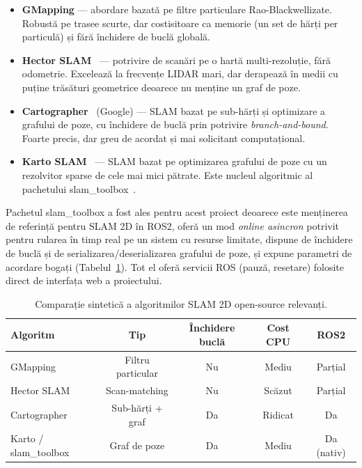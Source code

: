 \documentclass[a4paper,12pt,twoside,openany]{report}
\renewcommand{\texttt}[1]{\textnormal{#1}}
\begin{document}
\begin{itemize}\itemsep0pt
    \item \textbf{GMapping} --- abordare bazată pe filtre particulare
          Rao-Blackwellizate. Robustă pe trasee scurte, dar costisitoare
          ca memorie (un set de hărți per particulă) și fără închidere de
          buclă globală.
    \item \textbf{Hector SLAM}~\cite{kohlbrecher2011hector} --- potrivire
          de scanări pe o hartă multi-rezoluție, fără odometrie. Excelează
          la frecvențe LIDAR mari, dar derapează în medii cu puține
          trăsături geometrice deoarece nu menține un graf de poze.
    \item \textbf{Cartographer}~\cite{hess2016cartographer} (Google) ---
          SLAM bazat pe sub-hărți și optimizare a grafului de poze, cu
          închidere de buclă prin potrivire \textit{branch-and-bound}.
          Foarte precis, dar greu de acordat și mai solicitant
          computațional.
    \item \textbf{Karto SLAM}~\cite{konolige2010karto} --- SLAM bazat pe
          optimizarea grafului de poze cu un rezolvitor sparse de cele mai
          mici pătrate. Este nucleul algoritmic al pachetului
          \texttt{slam\_toolbox}~\cite{macenski2021slamtoolbox}.
\end{itemize}

Pachetul \texttt{slam\_toolbox} a fost ales pentru acest proiect deoarece
este menținerea de referință pentru SLAM 2D în ROS2, oferă un mod
\textit{online asincron} potrivit pentru rularea în timp real pe un
sistem cu resurse limitate, dispune de închidere de buclă și de
serializarea/deserializarea grafului de poze, și expune parametri de
acordare bogați (Tabelul~\ref{tab:slam-compare}). Tot el oferă servicii
ROS (pauză, resetare) folosite direct de interfața web a proiectului.

\begin{table}[H]
\centering
\caption{Comparație sintetică a algoritmilor SLAM 2D open-source relevanți.}
\label{tab:slam-compare}
\renewcommand{\arraystretch}{1.15}
\begin{tabular}{lcccc}
\toprule
\textbf{Algoritm} & \textbf{Tip} & \textbf{Închidere buclă} & \textbf{Cost CPU} & \textbf{ROS2} \\
\midrule
GMapping       & Filtru particular  & Nu       & Mediu  & Parțial \\
Hector SLAM    & Scan-matching      & Nu       & Scăzut & Parțial \\
Cartographer   & Sub-hărți + graf   & Da       & Ridicat& Da \\
Karto / \texttt{slam\_toolbox} & Graf de poze & Da & Mediu  & Da (nativ) \\
\bottomrule
\end{tabular}
\end{table}
\end{document}
